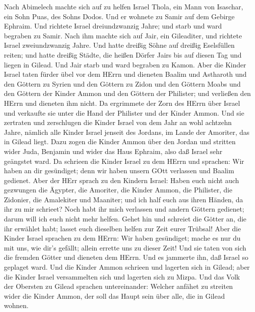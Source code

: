  Nach Abimelech machte sich auf zu helfen Israel Thola, ein
Mann von Isaschar, ein Sohn Puas, des Sohns Dodos. Und er wohnete zu
Samir auf dem Gebirge Ephraim.  Und richtete Israel
dreiundzwanzig Jahre; und starb und ward begraben zu Samir. 
Nach ihm machte sich auf Jair, ein Gileaditer, und richtete Israel
zweiundzwanzig Jahre.  Und hatte dreißig Söhne auf dreißig
Eselsfüllen reiten; und hatte dreißig Städte, die heißen Dörfer Jairs
bis auf diesen Tag und liegen in Gilead.  Und Jair starb und
ward begraben zu Kamon.  Aber die Kinder Israel taten fürder
übel vor dem HErrn und dieneten Baalim und Astharoth und den Göttern zu
Syrien und den Göttern zu Zidon und den Göttern Moabs und den Göttern
der Kinder Ammon und den Göttern der Philister; und verließen den HErrn
und dieneten ihm nicht.  Da ergrimmete der Zorn des HErrn
über Israel und verkaufte sie unter die Hand der Philister und der
Kinder Ammon.  Und sie zertraten und zerschlugen die Kinder
Israel von dem Jahr an wohl achtzehn Jahre, nämlich alle Kinder Israel
jenseit des Jordans, im Lande der Amoriter, das in Gilead liegt.
 Dazu zogen die Kinder Ammon über den Jordan und stritten
wider Juda, Benjamin und wider das Haus Ephraim, also daß Israel sehr
geängstet ward.  Da schrieen die Kinder Israel zu dem HErrn
und sprachen: Wir haben an dir gesündiget; denn wir haben unsern GOtt
verlassen und Baalim gedienet.  Aber der HErr sprach zu den
Kindern Israel: Haben euch nicht auch gezwungen die Ägypter, die
Amoriter, die Kinder Ammon, die Philister,  die Zidonier,
die Amalekiter und Maaniter; und ich half euch aus ihren Händen, da ihr
zu mir schrieet?  Noch habt ihr mich verlassen und andern
Göttern gedienet; darum will ich euch nicht mehr helfen. 
Gehet hin und schreiet die Götter an, die ihr erwählet habt; lasset euch
dieselben helfen zur Zeit eurer Trübsal!  Aber die Kinder
Israel sprachen zu dem HErrn: Wir haben gesündiget; mache es nur du mit
uns, wie dir's gefällt; allein errette uns zu dieser Zeit! 
Und sie taten von sich die fremden Götter und dieneten dem HErrn. Und es
jammerte ihn, daß Israel so geplaget ward.  Und die Kinder
Ammon schrieen und lagerten sich in Gilead; aber die Kinder Israel
versammelten sich und lagerten sich zu Mizpa.  Und das Volk
der Obersten zu Gilead sprachen untereinander: Welcher anfähet zu
streiten wider die Kinder Ammon, der soll das Haupt sein über alle, die
in Gilead wohnen.

